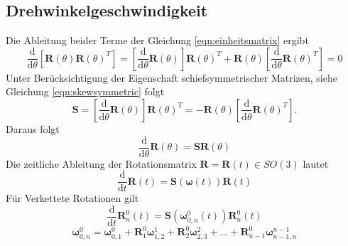 \subsection{Drehwinkelgeschwindigkeit}
Die Ableitung beider Terme der Gleichung \ref{eqn:einheitsmatrix} ergibt
\begin{equation} 
	\dfrac{\text{d}}{\text{d}\theta}\left[\bm{R}(\theta)\bm{R}(\theta)^T\right] = 	\left[\dfrac{\text{d}}{\text{d}\theta} {\bm{R}}(\theta)\right]\bm{R}(\theta)^T + \bm{R}(\theta)\left[\dfrac{\text{d}}{\text{d}\theta} {\bm{R}}(\theta)^T\right] = 0
\end{equation} 
Unter Berücksichtigung der Eigenschaft schiefsymmetrischer Matrizen, siehe Gleichung \ref{eqn:skewsymmetric} folgt
\begin{equation}
	\label{eqn:skewsymm}
	\bm{S} = \left[\dfrac{\text{d}}{\text{d}\theta}{\bm{R}}(\theta)\right]\bm{R}(\theta)^T  = -\bm{R}(\theta)     \left[\dfrac{\text{d}}{\text{d}\theta}{\bm{R}}(\theta)^T\right].
\end{equation} 
%
Daraus folgt
%
\begin{equation}
	\dfrac{\text{d}}{\text{d}\theta}\bm{R}(\theta) = \bm{SR}(\theta)
\end{equation} 
%
Die zeitliche Ableitung der Rotationsmatrix $\bm{R} = \bm{R}(t) \in SO(3)$ lautet
%
\begin{equation}
	\dfrac{\text{d}}{\text{d}t}\bm{R}(t) = \bm{S}\left(\bm{\omega}(t)\right)\bm{R}(t)
\end{equation} 
%
Für Verkettete Rotationen gilt
%
\begin{equation}
	\dfrac{\text{d}}{\text{d}t}\bm{R}^0_n(t) = \bm{S}\left(\bm{\omega}^0_{0,n}(t)\right)\bm{R}^0_n(t)
\end{equation} 
\begin{equation}
	\bm{\omega}^0_{0,n} = \bm{\omega}^0_{0,1} + \bm{R}^0_1\bm{\omega}^1_{1,2} + \bm{R}^0_2\bm{\omega}^2_{2,3} + ... + \bm{R}^0_{n-1}\bm{\omega}^{n-1}_{n-1,n}
\end{equation} 
%
%
